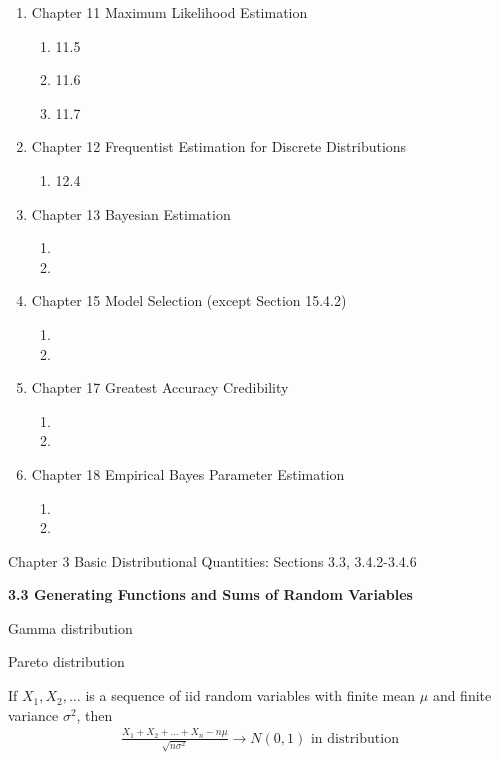 \documentclass[hidelinks, 12pt]{article}
\theoremstyle{mydefstyle}
\theoremstyle{mythmstyle}
\begin{document}
\begin{enumerate}[label=]
\item Chapter 11 Maximum Likelihood Estimation
\begin{enumerate}[label=]
\item 11.5
\item 11.6
\item 11.7
\end{enumerate}

\item Chapter 12 Frequentist Estimation for Discrete Distributions
\begin{enumerate}[label=]
\item 12.4
\end{enumerate}

\item Chapter 13 Bayesian Estimation
\begin{enumerate}[label=]
\item 
\item 
\end{enumerate}

\item Chapter 15 Model Selection (except Section 15.4.2)
\begin{enumerate}[label=]
\item 
\item 
\end{enumerate}

\item Chapter 17 Greatest Accuracy Credibility
\begin{enumerate}[label=]
\item 
\item 
\end{enumerate}

\item Chapter 18 Empirical Bayes Parameter Estimation
\begin{enumerate}[label=]
\item 
\item 
\end{enumerate}

\end{enumerate}

\newpage

Chapter 3 Basic Distributional Quantities: Sections 3.3, 3.4.2-3.4.6

\textbf{3.3 Generating Functions and Sums of Random Variables}

Gamma distribution

Pareto distribution

If $X_1, X_2, \dots$ is a sequence of iid random variables with finite mean $\mu$ and finite variance $\sigma^2$, then
\begin{gather*}
\frac{X_1 + X_2 + \dots + X_n - n\mu}{\sqrt{n\sigma^2}} \to N(0, 1) \mbox{ in distribution}
\end{gather*}
\end{document}
